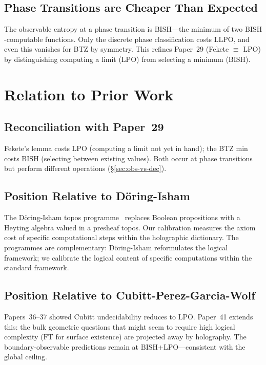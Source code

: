 \documentclass[11pt,a4paper]{article}
\theoremstyle{plain}
\theoremstyle{definition}
\newcommand{\LPO}{\ensuremath{\mathrm{LPO}}}
\newcommand{\LLPO}{\ensuremath{\mathrm{LLPO}}}
\newcommand{\BISH}{\ensuremath{\mathrm{BISH}}}
\newcommand{\FT}{\ensuremath{\mathrm{FT}}}
\begin{document}
\subsection{Phase Transitions are Cheaper Than Expected}

The observable entropy at a phase transition is $\BISH$---the
minimum of two $\BISH$-computable functions.  Only the discrete
phase classification costs $\LLPO$, and even this vanishes for
BTZ by symmetry.  This refines Paper~29 (Fekete $\equiv$ $\LPO$)
by distinguishing computing a limit ($\LPO$) from selecting a
minimum ($\BISH$).

\section{Relation to Prior Work}\label{sec:prior}

\subsection{Reconciliation with Paper~29}

Fekete's lemma costs $\LPO$ (computing a limit not yet in hand);
the BTZ min costs $\BISH$ (selecting between existing values).
Both occur at phase transitions but perform different operations
(\S\ref{sec:obs-vs-dec}).

\subsection{Position Relative to D\"oring-Isham}

The D\"oring-Isham topos programme~\cite{DoringIsham2008} replaces
Boolean propositions with a Heyting algebra valued in a presheaf
topos.  Our calibration measures the axiom cost of specific
computational steps within the holographic dictionary.  The
programmes are complementary: D\"oring-Isham reformulates the
logical framework; we calibrate the logical content of specific
computations within the standard framework.

\subsection{Position Relative to Cubitt-Perez-Garcia-Wolf}

Papers~36--37 showed Cubitt undecidability reduces to $\LPO$.
Paper~41 extends this: the bulk geometric questions that might
seem to require high logical complexity ($\FT$ for surface existence)
are projected away by holography.  The boundary-observable predictions
remain at $\BISH$+$\LPO$---consistent with the global ceiling.
\end{document}
